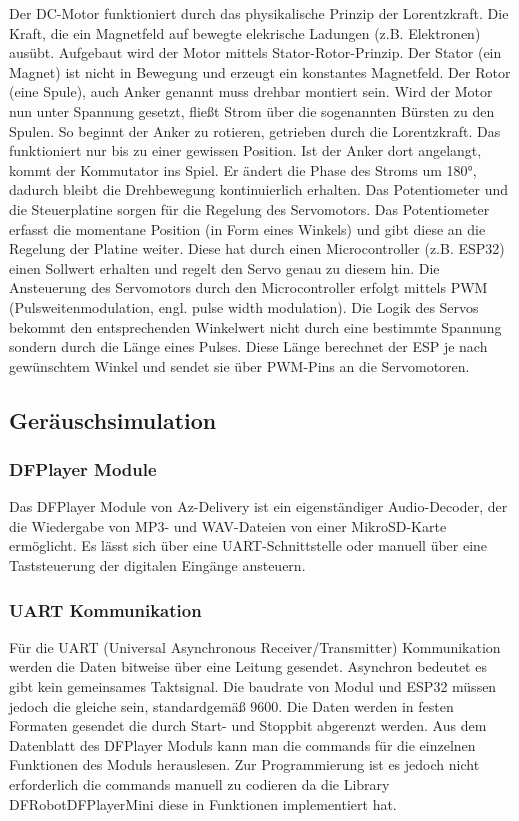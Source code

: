 \noindent
Der DC-Motor funktioniert durch das physikalische Prinzip der Lorentzkraft. Die Kraft, die ein Magnetfeld auf bewegte elekrische Ladungen
(z.B. Elektronen) ausübt. Aufgebaut wird der Motor mittels Stator-Rotor-Prinzip.
Der Stator (ein Magnet) ist nicht in Bewegung und erzeugt ein konstantes Magnetfeld. Der Rotor (eine Spule), auch
Anker genannt muss drehbar montiert sein. Wird der Motor nun unter Spannung gesetzt, 
fließt Strom über die sogenannten Bürsten zu den Spulen. So beginnt der Anker zu 
rotieren, getrieben durch die Lorentzkraft. Das funktioniert nur bis zu einer gewissen 
Position. Ist der Anker dort angelangt, kommt der Kommutator ins Spiel. Er ändert die Phase des Stroms um 
180°, dadurch bleibt die Drehbewegung kontinuierlich erhalten. 
\noindent
Das Potentiometer und die Steuerplatine sorgen für die Regelung des Servomotors. 
Das Potentiometer erfasst die momentane Position (in Form eines Winkels) und gibt diese an die 
Regelung der Platine weiter. Diese hat durch einen Microcontroller (z.B. ESP32) einen 
Sollwert erhalten und regelt den Servo genau zu diesem hin. 
\noindent
Die Ansteuerung des Servomotors durch den Microcontroller erfolgt mittels PWM
(Pulsweitenmodulation, engl. pulse width modulation). Die Logik des Servos bekommt den entsprechenden 
Winkelwert nicht durch eine bestimmte Spannung sondern durch die Länge eines Pulses. 
Diese Länge berechnet der ESP je nach gewünschtem Winkel und sendet sie über PWM-Pins an die Servomotoren. \cite{servomotor} \cite{pwm_servo}

\subsection{Geräuschsimulation} %
\subsubsection{DFPlayer Module} \label{Player}
Das DFPlayer Module von Az-Delivery ist ein eigenständiger Audio-Decoder, der die Wiedergabe 
von MP3- und WAV-Dateien von einer MikroSD-Karte ermöglicht. Es lässt sich über 
eine UART-Schnittstelle oder manuell über eine Taststeuerung der digitalen Eingänge ansteuern. \cite{dfplayer_datasheet}
\subsubsection{UART Kommunikation}
Für die UART (Universal Asynchronous Receiver/Transmitter) Kommunikation werden die Daten bitweise über 
eine Leitung gesendet. Asynchron bedeutet es gibt kein gemeinsames Taktsignal. Die baudrate von Modul und ESP32 müssen jedoch
die gleiche sein, standardgemäß 9600. Die Daten werden in
festen Formaten gesendet die durch Start- und Stoppbit abgerenzt werden. 
Aus dem Datenblatt des DFPlayer Moduls kann man die commands für die einzelnen 
Funktionen des Moduls herauslesen. Zur Programmierung ist es jedoch nicht erforderlich die commands manuell 
zu codieren da die Library DFRobotDFPlayerMini \cite{dfplayer_lib} diese in Funktionen implementiert hat. 
